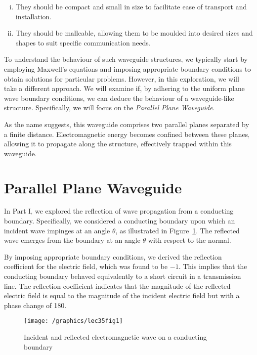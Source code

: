 \begin{enumerate}[(i)]
\item They should be compact and small in size to facilitate ease of transport and installation.
\item They should be malleable, allowing them to be moulded into desired sizes and shapes to suit specific communication needs.
\end{enumerate}

To understand the behaviour of such waveguide structures, we typically start by employing Maxwell's equations and imposing appropriate boundary conditions to obtain solutions for particular problems. However, in this exploration, we will take a different approach. We will examine if, by adhering to the uniform plane wave boundary conditions, we can deduce the behaviour of a waveguide-like structure. Specifically, we will focus on the \emph{Parallel Plane Waveguide}.

As the name suggests, this waveguide comprises two parallel planes separated by a finite distance. Electromagnetic energy becomes confined between these planes, allowing it to propagate along the structure, effectively trapped within this waveguide.

\section{Parallel Plane Waveguide}
In Part I, we explored the reflection of wave propagation from a conducting boundary. Specifically, we considered a conducting boundary upon which an incident wave impinges at an angle $\theta$, as illustrated in Figure~\ref{fig:lec35fig1}. The reflected wave emerges from the boundary at an angle $\theta$ with respect to the normal.

By imposing appropriate boundary conditions, we derived the reflection coefficient for the electric field, which was found to be $-1$. This implies that the conducting boundary behaved equivalently to a short circuit in a transmission line. The reflection coefficient indicates that the magnitude of the reflected electric field is equal to the magnitude of the incident electric field but with a phase change of 180\textdegree.
\begin{figure}[h]
\centering
\texttt{[image: /graphics/lec35fig1]}
\caption{Incident and reflected electromagnetic wave on a conducting boundary}
\label{fig:lec35fig1}
\end{figure}

